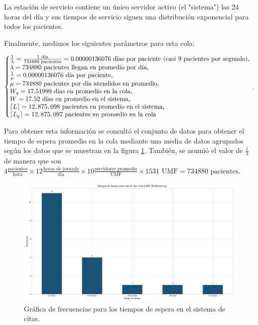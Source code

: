 \documentclass[10pt]{article}
\begin{document}
    La estación de servicio contiene un único servidor activo (el "sistema") las 24 horas del día y sus tiempos de servicio siguen una distribución exponencial para todos los pacientes.
    
    Finalmente, medimos los siguientes parámetros para esta cola:
    
    \newpage
    
    \begin{equation*}
    	\left\{
    	\begin{array}{@{}l@{}}
    		\frac{1}{\lambda} = \frac{1 \text{ día}}{734880 \text{ pacientes}} = 0.00000136076 \text{ días por paciente (casi 9 pacientes por segundo),} \\
    		\lambda = 734880 \text{ pacientes llegan en promedio por día,} \\
    		\frac{1}{\mu} = 0.00000136076 \text{ día por paciente,} \\
    		\mu = 734880 \text{ pacientes por día atendidos en promedio,} \\
    		W_{q} = 17.51999 \text{ días en promedio en la cola,} \\
    		W = 17.52 \text{ días en promedio en el sistema,} \\
    		\left\lceil L \right\rceil = 12,875,098 \text{ pacientes en promedio en el sistema,} \\
    		\left\lceil L_{q} \right\rceil = 12,875,097 \text{ pacientes en promedio en la cola}
    	\end{array}
    	\right.\,.
    \end{equation*}
    
    Para obtener esta información se consultó el conjunto de datos para obtener el tiempo de espera promedio en la cola mediante una media de datos agrupados según los datos que se muestran en la figura \ref{fig:frec_espera_cita}. También, se asumió el valor de $\frac{1}{\lambda}$ de manera que son $4 \frac{\text{pacientes}}{\text{hora}} \times 12 \frac{\text{horas de jornada}}{\text{día}} \times 10 \frac{\text{servidores promedio}}{\text{UMF}} \times 1531 \text{ UMF} = 734880 \text{ pacientes.}$
    
    \begin{figure}[h]
    	\centering
    	\includegraphics[width=\linewidth]{./images/rangos-tiempo-3-umf28.png}
    	\caption{Gráfica de frecuencias para los tiempos de espera en el sistema de citas.}
    	\label{fig:frec_espera_cita}
    \end{figure}
    
\end{document}
